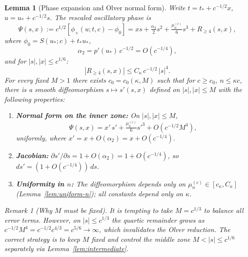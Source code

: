 \documentclass[12pt,a4paper]{amsart}
\newtheorem{lemma}[theorem]{Lemma}
\theoremstyle{definition}
\theoremstyle{remark}
\newtheorem{remark}[theorem]{Remark}
\newcommand{\ustar}{u_*}
\newcommand{\tstar}{t_*}
\begin{document}
\begin{lemma}[Phase expansion and Olver normal form]
\label{lem:phase}
Write $t = \tstar + c^{-1/2}x$,
$u = \ustar + c^{-1/2}s$.
The rescaled oscillatory phase is
\begin{equation}
\label{eq:phase-expand}
  \Psi(s,x) := c^{1/2}[\phi_+(u;t,c) - \phi_0]
  = xs + \tfrac{\alpha_2}{2}s^2
    + \tfrac{\mu_n^{(c)}}{6}s^3
    + R_{\ge 4}(s,x),
\end{equation}
where $\phi_0 = S(\ustar;c) + \tstar\ustar$,
\[
  \alpha_2 = p'(\ustar)\,c^{-1/2} = O(c^{-1/4}),
\]
and for $|s|, |x| \le c^{1/6}$:
\begin{equation}
\label{eq:R4-bound}
  |R_{\ge 4}(s,x)| \le C_\kappa\,c^{-1/2}\,|s|^4.
\end{equation}
For every fixed $M > 1$ there exists
$c_0 = c_0(\kappa, M)$ such that for
$c \ge c_0$, $n \le \kappa c$,
there is a smooth diffeomorphism
$s \mapsto s'(s,x)$ defined on $|s|, |x| \le M$
with the following properties:
\begin{enumerate}[\rm(i)]
  \item \textbf{Normal form on the inner zone:}
        On $|s|, |x| \le M$,
        \[
          \Psi(s,x) = x'\,s'
          + \tfrac{\mu_n^{(c)}}{6}s'^3
          + O(c^{-1/2}M^4),
        \]
        uniformly,
        where $x' = x + O(\alpha_2) = x + O(c^{-1/4})$.
  \item \textbf{Jacobian:}
        $\partial s'/\partial s = 1 + O(\alpha_2)
        = 1 + O(c^{-1/4})$,
        so $ds' = (1 + O(c^{-1/4}))\,ds$.
  \item \textbf{Uniformity in $n$:}
        The diffeomorphism depends only on
        $\mu_n^{(c)} \in [c_\kappa, C_\kappa]$
        \textup{(Lemma~\ref{lem:uniform-n})};
        all constants depend only on $\kappa$.
\end{enumerate}

\begin{remark}[Why $M$ must be fixed]
\label{rem:M-fixed}
It is tempting to take $M = c^{1/3}$
to balance all error terms.
However, on $|s| \le c^{1/3}$
the quartic remainder grows as
$c^{-1/2}M^4 = c^{-1/2}c^{4/3} = c^{5/6} \to \infty$,
which invalidates the Olver reduction.
The correct strategy is to keep $M$ fixed
and control the middle zone $M < |s| \le c^{1/6}$
separately via Lemma~\ref{lem:intermediate}.
\end{remark}
\end{lemma}
\end{document}
